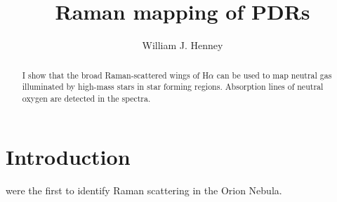 \documentclass[iop, apj]{emulateapj}
\begin{document}
\title{Raman mapping of PDRs}
\author{William J. Henney}

\begin{abstract}
  I show that the broad Raman-scattered wings of H\(\alpha\) can be used to
  map neutral gas illuminated by high-mass stars in star forming
  regions. Absorption lines of neutral oxygen are detected in the spectra. 
\end{abstract}

\section{Introduction}
\label{sec:introduction}

\citet{Dopita:2016a} were the first to identify Raman scattering in the Orion Nebula.


\end{document}
